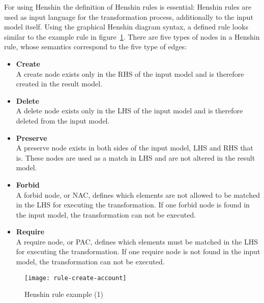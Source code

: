 For using Henshin the definition of Henshin rules is essential: Henshin rules
are used as input language for the transformation process, additionally to the
input model itself. Using the graphical Henshin diagram syntax, a defined rule
looks similar to the example rule in figure~\ref{Henshinrule_example_1}. There are
five types of nodes in a Henshin rule, whose semantics correspond to the five
type of edges:
\begin{itemize}
  \item \textbf{Create} \\
  	    A create node exists only in the \ac{RHS} of the input model and is
  	    therefore created in the result model.
  \item \textbf{Delete} \\
  	    A delete node exists only in the \ac{LHS} of the input model and is
  	    therefore deleted from the input model.
  \item \textbf{Preserve} \\
        A preserve node exists in both sides of the input model, \ac{LHS} and
        \ac{RHS} that is. These nodes are used as a match in \ac{LHS} and are not altered in the result model.
  \item \textbf{Forbid} \\
        A forbid node, or \ac{NAC}, defines which
        elements are not allowed to be matched in the \ac{LHS} for executing the
        transformation. If one forbid node is found in the input model, the
        transformation can not be executed.
  \item \textbf{Require} \\
        A require node, or \ac{PAC}, defines which
        elements must be matched in the \ac{LHS} for
        executing the transformation. If one require node is not found in the
        input model, the transformation can not be executed.
\end{itemize}
\begin{figure}[h!]
\begin{center}
\texttt{[image: rule-create-account]}\\
\end{center}
\caption{Henshin rule example (1)~\cite{Henshin}}
\label{Henshinrule_example_1}
\end{figure}

